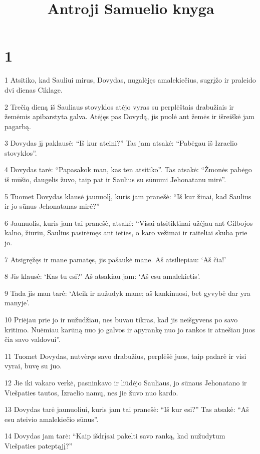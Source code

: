 

\title{Antroji Samuelio knyga}

\chapter{1}


\par 1 Atsitiko, kad Sauliui mirus, Dovydas, nugalėjęs amalekiečius, sugrįžo ir praleido dvi dienas Ciklage. 
\par 2 Trečią dieną iš Sauliaus stovyklos atėjo vyras su perplėštais drabužiais ir žemėmis apibarstyta galva. Atėjęs pas Dovydą, jis puolė ant žemės ir išreiškė jam pagarbą. 
\par 3 Dovydas jį paklausė: “Iš kur ateini?” Tas jam atsakė: “Pabėgau iš Izraelio stovyklos”. 
\par 4 Dovydas tarė: “Papasakok man, kas ten atsitiko”. Tas atsakė: “Žmonės pabėgo iš mūšio, daugelis žuvo, taip pat ir Saulius su sūnumi Jehonatanu mirė”. 
\par 5 Tuomet Dovydas klausė jaunuolį, kuris jam pranešė: “Iš kur žinai, kad Saulius ir jo sūnus Jehonatanas mirė?” 
\par 6 Jaunuolis, kuris jam tai pranešė, atsakė: “Visai atsitiktinai užėjau ant Gilbojos kalno, žiūriu, Saulius pasirėmęs ant ieties, o karo vežimai ir raiteliai skuba prie jo. 
\par 7 Atsigręžęs ir mane pamatęs, jis pašaukė mane. Aš atsiliepiau: ‘Aš čia!’ 
\par 8 Jis klausė: ‘Kas tu esi?’ Aš atsakiau jam: ‘Aš esu amalekietis’. 
\par 9 Tada jis man tarė: ‘Ateik ir nužudyk mane; aš kankinuosi, bet gyvybė dar yra manyje’. 
\par 10 Priėjau prie jo ir nužudžiau, nes buvau tikras, kad jis neišgyvens po savo kritimo. Nuėmiau karūną nuo jo galvos ir apyrankę nuo jo rankos ir atnešiau juos čia savo valdovui”. 
\par 11 Tuomet Dovydas, nutvėręs savo drabužius, perplėšė juos, taip padarė ir visi vyrai, buvę su juo. 
\par 12 Jie iki vakaro verkė, pasninkavo ir liūdėjo Sauliaus, jo sūnaus Jehonatano ir Viešpaties tautos, Izraelio namų, nes jie žuvo nuo kardo. 
\par 13 Dovydas tarė jaunuoliui, kuris jam tai pranešė: “Iš kur esi?” Tas atsakė: “Aš esu ateivio amalekiečio sūnus”. 
\par 14 Dovydas jam tarė: “Kaip išdrįsai pakelti savo ranką, kad nužudytum Viešpaties pateptąjį?” 
